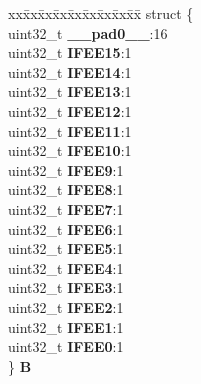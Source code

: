\begin{DoxyCompactItemize}
\begin{tabbing}
\end{tabbing}\item 
\mbox{\label{unionSIU__tag_1_1SIU__IFEER__tag_ad17a9f29a9ccb233eaac82b469b205d5}} 
\begin{tabbing}
xx\=xx\=xx\=xx\=xx\=xx\=xx\=xx\=xx\=\kill
struct \{\\
\>uint32\_t {\bfseries \_\_pad0\_\_}:16\\
\>uint32\_t {\bfseries IFEE15}:1\\
\>uint32\_t {\bfseries IFEE14}:1\\
\>uint32\_t {\bfseries IFEE13}:1\\
\>uint32\_t {\bfseries IFEE12}:1\\
\>uint32\_t {\bfseries IFEE11}:1\\
\>uint32\_t {\bfseries IFEE10}:1\\
\>uint32\_t {\bfseries IFEE9}:1\\
\>uint32\_t {\bfseries IFEE8}:1\\
\>uint32\_t {\bfseries IFEE7}:1\\
\>uint32\_t {\bfseries IFEE6}:1\\
\>uint32\_t {\bfseries IFEE5}:1\\
\>uint32\_t {\bfseries IFEE4}:1\\
\>uint32\_t {\bfseries IFEE3}:1\\
\>uint32\_t {\bfseries IFEE2}:1\\
\>uint32\_t {\bfseries IFEE1}:1\\
\>uint32\_t {\bfseries IFEE0}:1\\
\} {\bfseries B}\\


\end{tabbing}
\end{DoxyCompactItemize}
